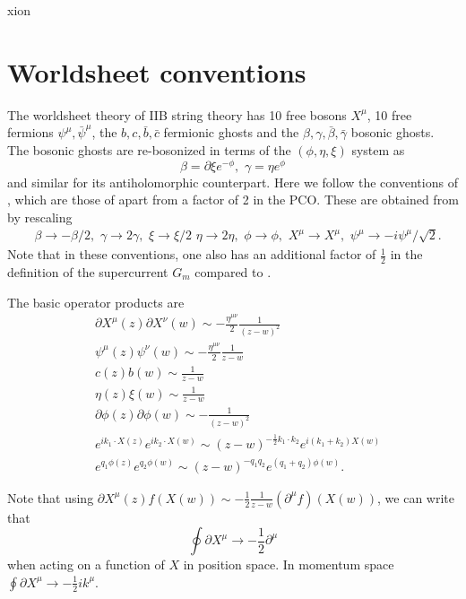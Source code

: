 xion\documentclass[12pt]{article}
\def\be{\begin{equation}}
\def\ee{\end{equation}}
\numberwithin{equation}{section}
\begin{document}
\section{Worldsheet conventions} \label{WSconventions}
The worldsheet theory of IIB string theory has 10 free bosons $X^\mu$, 10 free fermions $\psi^\mu, \bar{\psi}^\mu$, the $b,c, \bar{b}, \bar{c}$ fermionic ghosts and the $\beta, \gamma, \bar{\beta}, \bar{\gamma}$ bosonic ghosts. The bosonic ghosts are re-bosonized in terms of the $(\phi,\eta, \xi)$ system as
\begin{equation}
    \beta = \partial \xi e^{-\phi}, \, \, \gamma = \eta e^{\phi}
\end{equation}
and similar for its antiholomorphic counterpart. Here we follow the conventions of \cite{Sen:2024nfd}, which are those of \cite{Sen:2021tpp} apart from a factor of 2 in the PCO. These are obtained from \cite{Polchinski:1998rr} by rescaling
\begin{align}
    & \beta \to -\beta/2, \, \, \gamma \to 2 \gamma,  \, \, \xi \to \xi/2 \, \, \eta \to 2\eta, \, \, \phi \to \phi, \,\, X^\mu \to X^\mu, \, \, \psi^\mu \to -i \psi^\mu/\sqrt{2}.
\end{align}
Note that in these conventions, one also has an additional factor of $\frac{1}{2}$ in the definition of the supercurrent $G_m$ compared to  \cite{Polchinski:1998rr}.

{\allowdisplaybreaks

The basic operator products are
\be
\begin{aligned}
    &\partial X^\mu (z) \partial X^\nu (w) \sim -\frac{\eta^{\mu \nu}}{2} \frac{1}{(z-w)^2} \\
    &\psi^\mu (z) \psi^\nu (w) \sim -\frac{\eta^{\mu \nu}}{2} \frac{1}{z-w} \\
    & c(z) b(w) \sim \frac{1}{z-w} \\
    & \eta(z) \xi(w) \sim \frac{1}{z-w} \\
    & \partial \phi(z) \partial \phi(w) \sim - \frac{1}{(z-w)^2} \\
    &e^{i k_1 \cdot X(z)} e^{i k_2 \cdot X(w)} \sim (z-w)^{-\frac{1}{2} k_1 \cdot k_2} e^{i(k_1+k_2) X(w)}\\
&e^{q_1 \phi(z)} e^{q_2 \phi(w)} \sim (z-w)^{-q_1 q_2} e^{(q_1 + q_2)\phi(w)}.
\end{aligned}
\ee
}
Note that using
    $\partial X^\mu(z) f(X(w)) \sim -\frac{1}{2} \frac{1}{z-w} (\partial^\mu f)(X(w))$, we can write that
    \begin{equation}
        \oint \partial X^\mu \to -\frac{1}{2} \partial^\mu
    \end{equation}
    when acting on a function of $X$ in position space. In momentum space $\oint \partial X^\mu \to -\frac{1}{2} i k^\mu$.
\end{document}
